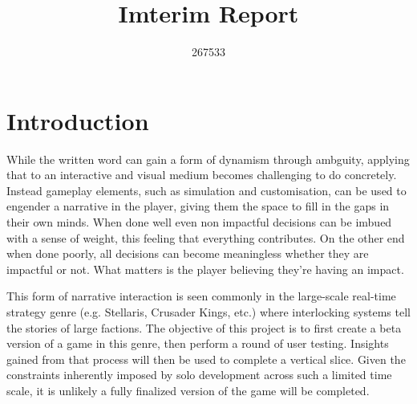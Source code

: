 \documentclass{report}
\begin{document}
\title{Imterim Report}
\author{267533}

\maketitle

\section{Introduction}
While the written word can gain a form of dynamism through ambguity, applying that to an interactive and visual medium becomes challenging to do concretely. Instead gameplay elements, such as simulation and customisation, can be used to engender a narrative in the player, giving them the space to fill in the gaps in their own minds. When done well even non impactful decisions can be imbued with a sense of weight, this feeling that everything contributes. On the other end when done poorly, all decisions can become meaningless whether they are impactful or not. What matters is the player believing they're having an impact. 

This form of narrative interaction is seen commonly in the large-scale real-time strategy genre (e.g. Stellaris, Crusader Kings, etc.) where interlocking systems tell the stories of large factions. The objective of this project is to first create a beta version of a game in this genre, then perform a round of user testing. Insights gained from that process will then be used to complete a vertical slice. Given the constraints inherently imposed by solo development across such a limited time scale, it is unlikely a fully finalized version of the game will be completed.
\end{document}
